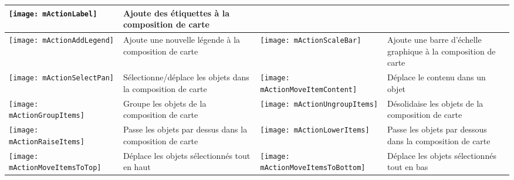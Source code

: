 \begin{table}[h]
\begin{tabular}{|l|p{6.9cm}|l|p{6.9cm}|}
\texttt{[image: mActionLabel]} & Ajoute des étiquettes à la
composition de carte \\
\hline \texttt{[image: mActionAddLegend]} & Ajoute une nouvelle 
légende à la composition de carte &
 \texttt{[image: mActionScaleBar]} & Ajoute une barre
d'échelle graphique à la composition de carte\\
\hline \texttt{[image: mActionSelectPan]} & Sélectionne/déplace les
objets dans la composition de carte &
\texttt{[image: mActionMoveItemContent]} & Déplace le contenu dans
un objet \\
 \hline \texttt{[image: mActionGroupItems]} & Groupe les objets de
la composition de carte & 
 \texttt{[image: mActionUngroupItems]} & Désolidaise les objets de
la composition de carte \\
 \hline \texttt{[image: mActionRaiseItems]} & Passe les objets par
dessus dans la composition de carte &
\texttt{[image: mActionLowerItems]} & Passe les objets par dessous
dans la composition de carte \\
 \hline \texttt{[image: mActionMoveItemsToTop]} & Déplace les
objets sélectionnés tout en haut & 
 \texttt{[image: mActionMoveItemsToBottom]} & Déplace les
objets sélectionnés tout en bas \\
\hline
\end{tabular}
\end{table}

